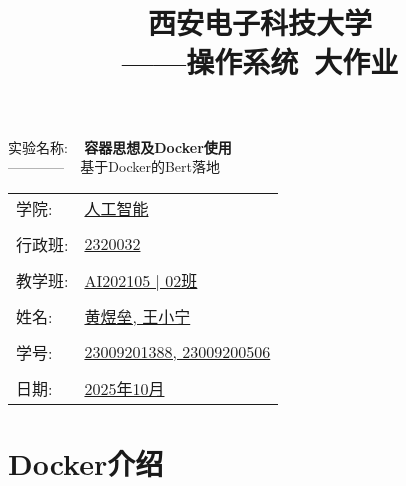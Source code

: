 \documentclass[UTF8]{ctexart}
\title{
    \Huge \textbf{西安电子科技大学} \\
    \vspace{0.5cm} 
    ——\LARGE 操作系统~大作业
}
\author{}
\date{}
\begin{document}


\maketitle

\begin{center}
    \Huge 实验名称: ~ \textbf{容器思想及Docker使用}
    \\
    \Large ———— ~ 基于Docker的Bert落地
\end{center}

\vspace{1cm}

\begin{center}
    \Large
    \begin{tabular}{ll}
        学院: & \underline{人工智能}\\
        & \\
        行政班: & \underline{2320032}\\
        & \\
        教学班: & \underline{AI202105 | 02班}\\
        & \\
        姓名: & \underline{黄煜垒, 王小宁}\\
        & \\
        学号: & \underline{23009201388, 23009200506}\\
        & \\
        日期: & \underline{2025年10月}\\
    \end{tabular}
\end{center}

\newpage %

\tableofcontents %

\newpage %


\section{Docker介绍}
\end{document}
